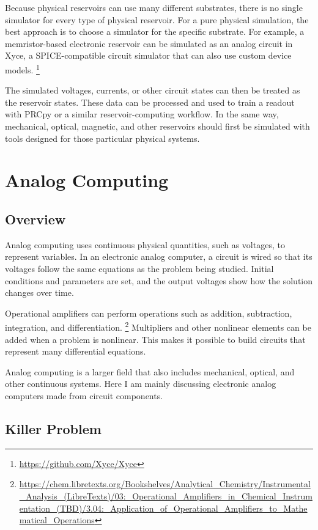 \documentclass{article}
\begin{document}
Because physical reservoirs can use many different substrates, there is no single simulator for every type of physical reservoir. For a pure physical simulation, the best approach is to choose a simulator for the specific substrate. For example, a memristor-based electronic reservoir can be simulated as an analog circuit in Xyce, a SPICE-compatible circuit simulator that can also use custom device models.
\footnote{\url{https://github.com/Xyce/Xyce}}

The simulated voltages, currents, or other circuit states can then be treated as the reservoir states. These data can be processed and used to train a readout with PRCpy or a similar reservoir-computing workflow. In the same way, mechanical, optical, magnetic, and other reservoirs should first be simulated with tools designed for those particular physical systems.


\section{Analog Computing}

\subsection{Overview}

Analog computing uses continuous physical quantities, such as voltages, to represent variables. In an electronic analog computer, a circuit is wired so that its voltages follow the same equations as the problem being studied. Initial conditions and parameters are set, and the output voltages show how the solution changes over time.

Operational amplifiers can perform operations such as addition, subtraction, integration, and differentiation.
\footnote{\url{https://chem.libretexts.org/Bookshelves/Analytical_Chemistry/Instrumental_Analysis_(LibreTexts)/03:_Operational_Amplifiers_in_Chemical_Instrumentation_(TBD)/3.04:_Application_of_Operational_Amplifiers_to_Mathematical_Operations}}
Multipliers and other nonlinear elements can be added when a problem is nonlinear. This makes it possible to build circuits that represent many differential equations.

Analog computing is a larger field that also includes mechanical, optical, and other continuous systems. Here I am mainly discussing electronic analog computers made from circuit components.

\subsection{Killer Problem}
\end{document}

